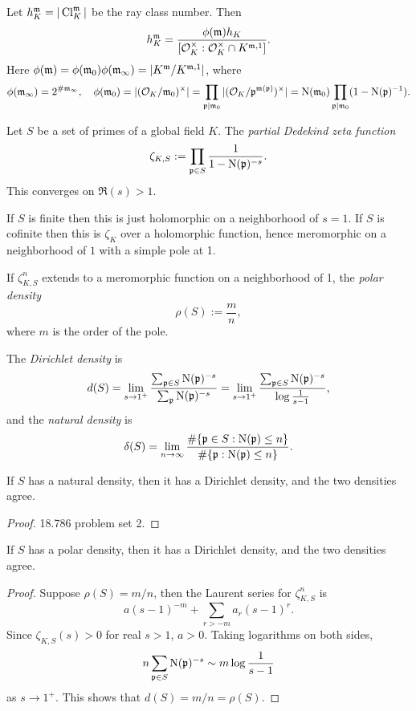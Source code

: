 \documentclass[11pt]{amsart}
\begin{document}
\begin{cor}
    Let $h_K^{\mathfrak{m}} = |\operatorname{Cl}_K^{\mathfrak{m}}|$ be the ray class number. Then 
    \[h_K^{\mathfrak{m}} = \frac{\phi(\mathfrak{m})h_K}{[\mathcal{O}_K^\times : \mathcal{O}_K^\times\cap K^{\mathfrak{m}, 1}]}.\]
    Here $\phi(\mathfrak{m}) = \phi(\mathfrak{m}_0)\phi(\mathfrak{m}_\infty) = |K^{\mathfrak{m}}/K^{\mathfrak{m},1}|$, where 
    \[\phi(\mathfrak{m}_\infty) = 2^{\#\mathfrak{m}_\infty}, \quad \phi(\mathfrak{m}_0) = |(\mathcal{O}_K/\mathfrak{m}_0)^\times| = \prod_{\mathfrak{p}\mid \mathfrak{m}_0} |(\mathcal{O}_K/\mathfrak{p}^{\mathfrak{m}(\mathfrak{p})})^\times| = \operatorname{N}(\mathfrak{m}_0)\prod_{\mathfrak{p}\mid \mathfrak{m}_0}(1-\operatorname{N}(\mathfrak{p})^{-1}).\]
\end{cor}


\begin{defn}
    Let $S$ be a set of primes of a global field $K$. The \emph{partial Dedekind zeta function}
    \[\zeta_{K, S} := \prod_{\mathfrak{p}\in S} \frac{1}{1- \operatorname{N}(\mathfrak{p})^{-s}}.\]
    This converges on $\Re(s)>1$.
\end{defn}

If $S$ is finite then this is just holomorphic on a neighborhood of $s=1$. If $S$ is cofinite then this is $\zeta_K$ over a holomorphic function, hence meromorphic on a neighborhood of $1$ with a simple pole at 1.

\begin{defn}
    If $\zeta_{K,S}^n$ extends to a meromorphic function on a neighborhood of 1, the \emph{polar density}
    \[\rho(S) := \frac{m}{n},\]
    where $m$ is the order of the pole.
\end{defn}

The \emph{Dirichlet density} is
\[d(S) = \lim_{s\to 1^+}\frac{\sum_{\mathfrak{p}\in S} \operatorname{N}(\mathfrak{p})^{-s}}{\sum_{\mathfrak{p}} \operatorname{N}(\mathfrak{p})^{-s}} = \lim_{s\to 1^+}\frac{\sum_{\mathfrak{p}\in S} \operatorname{N}(\mathfrak{p})^{-s}}{\log\frac{1}{s-1}},\]
and the \emph{natural density} is
\[\delta(S) = \lim_{n\to\infty}\frac{\#\{\mathfrak{p}\in S: \operatorname{N}(\mathfrak{p}) \le n\}}{\#\{\mathfrak{p}: \operatorname{N}(\mathfrak{p}) \le n\}}.\]

\begin{prop}
    If $S$ has a natural density, then it has a Dirichlet density, and the two densities agree.
\end{prop}

\begin{proof}
    18.786 problem set 2.
\end{proof}

\begin{prop}
    If $S$ has a polar density, then it has a Dirichlet density, and the two densities agree.
\end{prop}

\begin{proof}
    Suppose $\rho(S) = m/n$, then the Laurent series for $\zeta_{K,S}^n$ is
    \[a(s-1)^{-m} + \sum_{r > -m} a_{r}(s-1)^{r}.\]
    Since $\zeta_{K,S}(s)>0$ for real $s>1$, $a>0$. Taking logarithms on both sides,
    \[n \sum_{\mathfrak{p}\in S} \operatorname{N}(\mathfrak{p})^{-s} \sim m\log \frac{1}{s-1}\]
    as $s\to 1^+$. This shows that $d(S) = m/n = \rho(S)$.
\end{proof}
\end{document}
